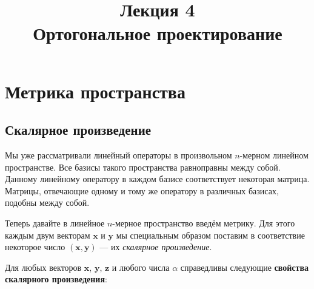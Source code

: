 \documentclass[11pt,a4paper]{article}
\title{
      {\Large Лекция 4} \\
      Ортогональное проектирование
    }
\date{}
\begin{document}
  \maketitle
  \thispagestyle{empty}
  \tableofcontents


  \newpage


    \hypertarget{ux43cux435ux442ux440ux438ux43aux430-ux43fux440ux43eux441ux442ux440ux430ux43dux441ux442ux432ux430}{%
\section{Метрика
пространства}\label{ux43cux435ux442ux440ux438ux43aux430-ux43fux440ux43eux441ux442ux440ux430ux43dux441ux442ux432ux430}}

\hypertarget{ux441ux43aux430ux43bux44fux440ux43dux43eux435-ux43fux440ux43eux438ux437ux432ux435ux434ux435ux43dux438ux435}{%
\subsection{Скалярное
произведение}\label{ux441ux43aux430ux43bux44fux440ux43dux43eux435-ux43fux440ux43eux438ux437ux432ux435ux434ux435ux43dux438ux435}}

Мы уже рассматривали линейный операторы в произвольном \(n\)-мерном
линейном пространстве. Все базисы такого пространства равноправны между
собой. Данному линейному оператору в каждом базисе соответствует
некоторая матрица. Матрицы, отвечающие одному и тому же оператору в
различных базисах, подобны между собой.

Теперь давайте в линейное \(n\)-мерное пространство введём метрику. Для
этого каждым двум векторам \(\mathbf{x}\) и \(\mathbf{y}\) мы
специальным образом поставим в соответствие некоторое число
\((\mathbf{x}, \mathbf{y})\) --- их \emph{скалярное произведение}.

Для любых векторов \(\mathbf{x}\), \(\mathbf{y}\), \(\mathbf{z}\) и
любого числа \(\alpha\) справедливы следующие \textbf{свойства
скалярного произведения}:
\end{document}
